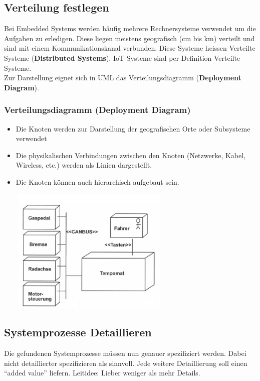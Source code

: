 \subsection{Verteilung festlegen}
Bei Embedded Systems werden häufig mehrere Rechnersysteme verwendet um die Aufgaben zu erledigen. Diese liegen meistens geografisch (cm bis km) verteilt und sind mit einem Kommunikationskanal verbunden. Diese Systeme heissen Verteilte Systeme (\textbf{Distributed Systems}). IoT-Systeme sind per Definition Verteilte Systeme.\\
Zur Darstellung eignet sich in UML das Verteilungsdiagramm (\textbf{Deployment Diagram}).

\subsubsection{Verteilungsdiagramm (Deployment Diagram)}
\begin{multicols}{2}
\begin{itemize}
	\item Die Knoten werden zur Darstellung der geografischen Orte oder Subsysteme verwendet
	\item Die physikalischen Verbindungen zwischen den Knoten (Netzwerke, Kabel, Wireless, etc.) werden als Linien dargestellt.
	\item Die Knoten können auch hierarchisch aufgebaut sein.
\end{itemize}
\vfill\null
\columnbreak
\includegraphics[height=6cm, width = 9cm,]{images/Modellierung/Verteilungsdiagramm}
\end{multicols}

\subsection{Systemprozesse Detaillieren}
Die gefundenen Systemprozesse müssen nun genauer spezifiziert werden. Dabei nicht detaillierter spezifizieren als sinnvoll. Jede weitere Detaillierung soll einen "`added value"' liefern.
Leitidee: Lieber weniger als mehr Details.

